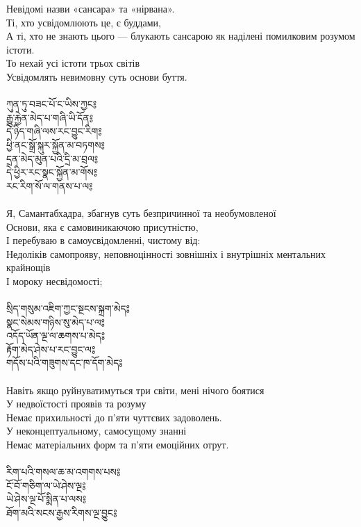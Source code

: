 Невідомі назви «сансара» та «нірвана». \\
Ті, хто усвідомлюють це, є буддами, \\
А ті, хто не знають цього --- блукають сансарою як наділені помилковим розумом істоти. \\
То нехай усі істоти трьох світів \\
Усвідомлять невимовну суть основи буття. \\
\\
{\ti
ཀུན་ཏུ་བཟང་པོ་ང་ཡིས་ཀྱང༔ \\
རྒྱུ་རྐྱེན་མེད་པ་གཞི་ཡི་དོན༔ \\
དེ་ཉིད་གཞི་ལས་རང་བྱུང་རིག༔ \\
ཕྱི་ནང་སྒྲོ་སྐུར་སྐྱོན་མ་བཏགས༔ \\
དྲན་མེད་མུན་པའི་དྲི་མ་བྲལ༔ \\
དེ་ཕྱིར་རང་སྣང་སྐྱོན་མ་གོས༔ \\
རང་རིག་སོ་ལ་གནས་པ་ལ༔}\\
\\
Я, Самантабхадра, збагнув суть безпричинної та необумовленої \\
Основи, яка є самовиникаючою присутністю, \\
І перебуваю в самоусвідомленні, чистому від: \\
Недоліків самопрояву, неповноцінності зовнішніх і внутрішніх ментальних крайнощів \\
І мороку несвідомості; \\
\\
\newpage
{\ti
སྲིད་གསུམ་འཇིག་ཀྱང་སྔངས་སྐྲག་མེད༔\\
སྣང་སེམས་གཉིས་སུ་མེད་པ་ལ༔\\
འདོད་ཡོན་ལྔ་ལ་ཆགས་པ་མེད༔\\
རྟོག་མེད་ཤེས་པ་རང་བྱུང་ལ༔\\
གདོས་པའི་གཟུགས་དང་ཁ་དོག་མེད༔}\\
\\
Навіть якщо руйнуватимуться три світи, мені нічого боятися \\
У недвоїстості проявів та розуму \\
Немає прихильності до п'яти чуттєвих задоволень. \\
У неконцептуальному, самосущому знанні \\
Немає матеріальних форм та п'яти емоційних отрут. \\
\\
{\ti
རིག་པའི་གསལ་ཆ་མ་འགགས་པས༔ \\
ངོ་བོ་གཅིག་ལ་ཡེ་ཤེས་ལྔ༔ \\
ཡེ་ཤེས་ལྔ་པོ་སྨིན་པ་ལས༔ \\
ཐོག་མའི་སངས་རྒྱས་རིགས་ལྔ་བྱུང༔}\\

